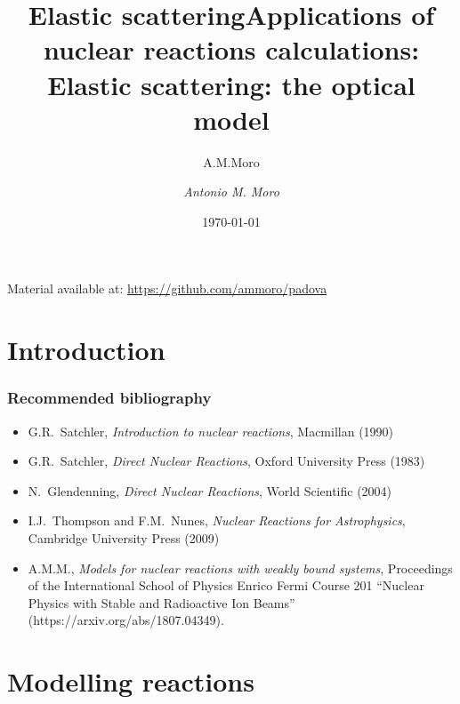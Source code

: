 \documentclass[english,10pt]{beamer}
\title[Elastic scattering]{Elastic scattering}
\author[A.M.Moro]{A.M.Moro}
\date{\today}{}
\title[Elastic scattering: the optical model]%
  {Applications of nuclear reactions calculations: \\
   Elastic scattering: the optical model}
\author[A. M. Moro]{\emph{Antonio M. Moro} }
\date{}{}
\institute[Universidad de Sevilla, Spain]{
\texttt{[image: images/logous.eps]} \\
{\color{ASUred} Universidad de Sevilla, Spain}

}
\newcommand{\slide}[1]{\begin{frame} \frametitle{ #1}}
\begin{document}
\begin{frame}[plain]
	\titlepage
	\transboxout
		\centering
	 {\footnotesize Material available at: \url{https://github.com/ammoro/padova}}
\end{frame}


\section{Introduction}



\slide{Recommended bibliography} 

\begin{itemize}
\item G.R.~Satchler, {\it Introduction to nuclear reactions}, Macmillan (1990)

\item G.R.~Satchler, {\it Direct Nuclear Reactions}, Oxford University Press (1983)

\item N.~Glendenning,  {\it Direct Nuclear Reactions}, World Scientific (2004)

\item I.J.~Thompson and F.M.~Nunes, {\it Nuclear Reactions for Astrophysics}, Cambridge University Press (2009)

\item A.M.M., {\it Models for nuclear reactions with weakly bound systems}, Proceedings of the International School of Physics Enrico Fermi
Course 201 ``Nuclear Physics with Stable and Radioactive Ion Beams'' (https://arxiv.org/abs/1807.04349).


\end{itemize}

\end{frame}


\section{Modelling reactions}

\end{document}
